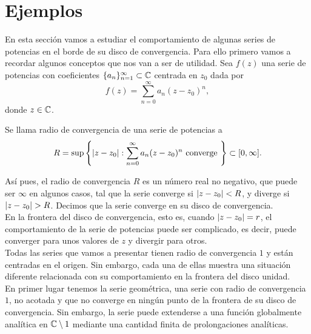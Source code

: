 \chapter{Ejemplos}
\label{cap:ejemplos}

En esta sección vamos a estudiar el comportamiento de algunas series de potencias en el borde de su disco de convergencia. Para ello primero vamos a recordar algunos conceptos que nos van a ser de utilidad. Sea $f(z)$ una serie de potencias con coeficientes $\{a_n\}_{n=1}^{\infty} \subset \mathbb{C}$ centrada en $z_0$ dada por
\begin{equation*}
    f(z) =  \sum_{n=0}^\infty a_n (z-z_0)^n,
\end{equation*}
donde $z \in \mathbb{C}$. \\

\begin{definition}
    Se llama radio de convergencia de una serie de potencias a
    \begin{equation*}
        R = \sup \left\{ \left\lvert z - z_0\right\rvert : \sum _{n=0}^{\infty} a_n (z - z_0)^n \text{ converge } \right\} \subset [0, \infty].
    \end{equation*}
\end{definition}
\medskip

Así pues, el radio de convergencia $R$ es un número real no negativo, que puede ser $\infty$ en algunos casos, tal que la serie converge si $\left\lvert z - z_0\right\rvert < R$, y diverge si $\left\lvert z - z_0\right\rvert > R$. Decimos que la serie converge en su disco de convergencia. \\

En la frontera del disco de convergencia, esto es, cuando $\left\lvert z - z_0\right\rvert = r$, el comportamiento de la serie de potencias puede ser complicado, es decir, puede converger para unos valores de $z$ y divergir para otros. \\

Todas las series que vamos a presentar tienen radio de convergencia $1$ y están centradas en el origen. Sin embargo, cada una de ellas muestra una situación diferente relacionada con su comportamiento en la frontera del disco unidad. \\


En primer lugar tenemos la serie geométrica, una serie con radio de convergencia $1$, no acotada y que no converge en ningún punto de la frontera de su disco de convergencia. Sin embargo, la serie puede extenderse a una función globalmente analítica en $\mathbb{C} \setminus{1}$ mediante una cantidad finita de prolongaciones analíticas. \\


